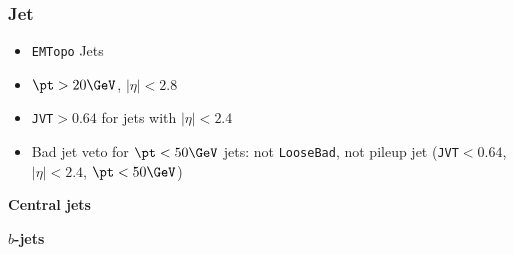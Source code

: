 \subsubsection{Jet}
\begin{itemize}
  \item \verb+EMTopo+ Jets
  \item $\pt>20\GeV$, $|\eta|<2.8$
  \item \verb+JVT+$>0.64$ for jets with $|\eta|<2.4$
  \item Bad jet veto for $\pt<50\GeV$ jets: not \verb+LooseBad+, not pileup jet (\verb+JVT+$<0.64$, $|\eta|<2.4$, $\pt<50\GeV$)
\end{itemize}

{\bf Central jets}

{\bf $b$-jets}

